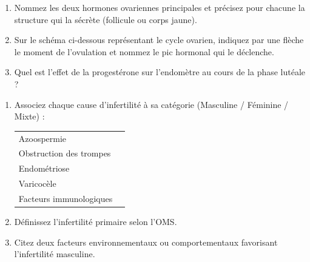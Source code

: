 \documentclass[11pt]{article}
\begin{document}
\begin{exercice}
\begin{enumerate}
    \item Nommez les deux hormones ovariennes principales et précisez pour chacune la structure qui la sécrète (follicule ou corps jaune).
    \item Sur le schéma ci-dessous représentant le cycle ovarien, indiquez par une flèche le moment de l'ovulation et nommez le pic hormonal qui le déclenche.
    \begin{center}
    \end{center}
    \item Quel est l'effet de la progestérone sur l'endomètre au cours de la phase lutéale ?
\end{enumerate}
\end{exercice}

\begin{exercice}
\begin{enumerate}
    \item Associez chaque cause d'infertilité à sa catégorie (Masculine / Féminine / Mixte) :
    \begin{tabular}{ll}
    Azoospermie & \underline{\hspace{2cm}} \\
    Obstruction des trompes & \underline{\hspace{2cm}} \\
    Endométriose & \underline{\hspace{2cm}} \\
    Varicocèle & \underline{\hspace{2cm}} \\
    Facteurs immunologiques & \underline{\hspace{2cm}}
    \end{tabular}
    \item Définissez l'infertilité primaire selon l'OMS.
    \item Citez deux facteurs environnementaux ou comportementaux favorisant l'infertilité masculine.
\end{enumerate}
\end{exercice}
\end{document}
